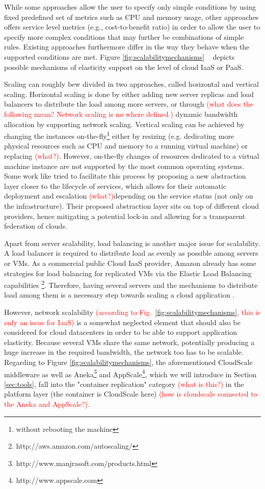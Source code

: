 \documentclass{sig-alternate}
\newcommand\todo[1]{\textcolor{red}{(#1)}}
\begin{document}
While some approaches allow the user to specify only simple conditions by using fixed predefined set of metrics such as CPU and memory usage, other approaches offers service level metrics (e.g., cost-to-benefit ratio) in order to allow the user to specify more complex conditions that may further be combinations of simple rules. Existing approaches furthermore differ in the way they behave when the supported conditions are met. Figure \ref{fig:scalabilitymechanisms} ~\cite{vaquero2011dynamically} depicts possible mechanisms of elasticity support on the level of cloud IaaS or PaaS.

Scaling can roughly bew divided in two approaches, called horizontal and vertical scaling. Horizontal scaling is done by either adding new server replicas and load balancers to distribute the load among more servers, or through \todo{what does the following mean? Network scaling is no where defined.} dynamic bandwidth allocation by supporting network scaling. Vertical scaling can be achieved by changing the instances on-the-fly\footnote{without rebooting the machine} either by resizing (e.g. dedicating more physical resources such as CPU and memory to a running virtual machine) or replacing \todo{what?}. However, on-the-fly changes of resources dedicated to a virtual machine instance are not supported by the most common operating systems. Some work like \cite{rodero2010infrastructure} tried to facilitate this process by proposing a new abstraction layer closer to the lifecycle of services, which allows for their automatic deployment and escalation \todo{what?}depending on the service status (not only on the infrastructure). Their proposed abstraction layer sits on top of different cloud providers, hence mitigating a potential lock-in and allowing for a transparent federation of clouds.

Apart from server scalability, load balancing is another major issue for scalability. A load balancer is required to distribute load as evenly as possible among servers or VMs. As a commercial public Cloud IaaS provider, Amazon already has some strategies for load balancing for replicated VMs via the Elastic Load Balancing capabilities \footnote{http://aws.amazon.com/autoscaling/}. Therefore, having several servers and the mechanisms to distribute load among them is a necessary step towards scaling a cloud application \cite{rodero2010infrastructure}. 

However, network scalability \todo{according to  Fig.~\ref{fig:scalabilitymechanisms}, this is only an issue for IaaS} is a somewhat neglected element that should also be considered \cite{wu2009unified} for cloud datacenters in order to be able to support application elasticity. Because several VMs share the same network, potentially producing a huge increase in the required bandwidth, the network too has to be scalable. Regarding to Figure \ref{fig:scalabilitymechanisms}, the aforementioned CloudScale middleware as well as Aneka\footnote{http://www.manjrasoft.com/products.html} and AppScale\footnote{http://www.appscale.com}, which we will introduce in Section \ref{sec:tools}, fall into the "container replication" category \todo{what is this?} in the platform layer (the container is CloudScale here) \todo{how is cloudscale connected to the Aneka and AppScale?}.
\end{document}
